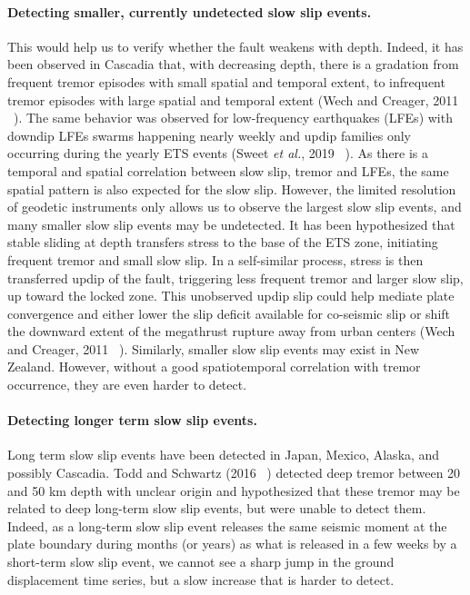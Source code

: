 \documentclass[letterpaper, 12pt]{article}
\begin{document}
\paragraph{Detecting smaller, currently undetected slow slip events.} This would help us to verify whether the fault weakens with depth. Indeed, it has been observed in Cascadia that, with decreasing depth, there is a gradation from frequent tremor episodes with small spatial and temporal extent, to infrequent tremor episodes with large spatial and temporal extent (Wech and Creager, 2011 ~\cite{WEC_2011}). The same behavior was observed for low-frequency earthquakes (LFEs) with downdip LFEs swarms happening nearly weekly and updip families only occurring during the yearly ETS events (Sweet \textit{et al.}, 2019 ~\cite{SWE_2019}). As there is a temporal and spatial correlation between slow slip, tremor and LFEs, the same spatial pattern is also expected for the slow slip. However, the limited resolution of geodetic instruments only allows us to observe the largest slow slip events, and many smaller slow slip events may be undetected. It has been hypothesized that stable sliding at depth transfers stress to the base of the ETS zone, initiating frequent tremor and small slow slip. In a self-similar process, stress is then transferred updip of the fault, triggering less frequent tremor and larger slow slip, up toward the locked zone. This unobserved updip slip could help mediate plate convergence and either lower the slip deficit available for co-seismic slip or shift the downward extent of the megathrust rupture away from urban centers (Wech and Creager, 2011 ~\cite{WEC_2011}). Similarly, smaller slow slip events may exist in New Zealand. However, without a good spatiotemporal correlation with tremor occurrence, they are even harder to detect.

\paragraph{Detecting longer term slow slip events.} Long term slow slip events have been detected in Japan, Mexico, Alaska, and possibly Cascadia. Todd and Schwartz (2016 ~\cite{TOD_2016}) detected deep tremor between 20 and 50 km depth with unclear origin and hypothesized that these tremor may be related to deep long-term slow slip events, but were unable to detect them. Indeed, as a long-term slow slip event releases the same seismic moment at the plate boundary during months (or years) as what is released in a few weeks by a short-term slow slip event, we cannot see a sharp jump in the ground displacement time series, but a slow increase that is harder to detect.
\end{document}
